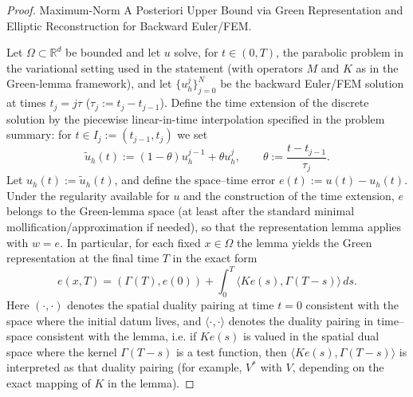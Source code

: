 \documentclass[11pt]{article}
\begin{document}
\begin{proof}
Maximum-Norm A Posteriori Upper Bound via Green Representation and Elliptic Reconstruction for Backward Euler/FEM.

Let $\Omega\subset\mathbb{R}^d$ be bounded and let $u$ solve, for $t\in(0,T)$, the parabolic problem in the variational setting used in the statement (with operators $M$ and $K$ as in the Green-lemma framework), and let $\{u_h^j\}_{j=0}^N$ be the backward Euler/FEM solution at times $t_j=j\tau$ ($\tau_j:=t_j-t_{j-1}$). Define the time extension of the discrete solution by the piecewise linear-in-time interpolation specified in the problem summary: for $t\in I_j:=(t_{j-1},t_j)$ we set
\[
\tilde u_h(t):=(1-\theta)u_h^{j-1}+\theta u_h^j,\qquad \theta:=\frac{t-t_{j-1}}{\tau_j}.
\]
Let $u_h(t):=\tilde u_h(t)$, and define the space--time error $e(t):=u(t)-u_h(t)$. Under the regularity available for $u$ and the construction of the time extension, $e$ belongs to the Green-lemma space (at least after the standard minimal mollification/approximation if needed), so that the representation lemma applies with $w=e$. In particular, for each fixed $x\in\Omega$ the lemma yields the Green representation at the final time $T$ in the exact form
\[
e(x,T)=(\Gamma(T),e(0))+\int_0^T \langle K e(s),\Gamma(T-s)\rangle\,ds.
\]
Here $(\cdot,\cdot)$ denotes the spatial duality pairing at time $t=0$ consistent with the space where the initial datum lives, and $\langle\cdot,\cdot\rangle$ denotes the duality pairing in time--space consistent with the lemma, i.e. if $K e(s)$ is valued in the spatial dual space where the kernel $\Gamma(T-s)$ is a test function, then $\langle K e(s),\Gamma(T-s)\rangle$ is interpreted as that duality pairing (for example, $V^*$ with $V$, depending on the exact mapping of $K$ in the lemma).


\end{proof}
\end{document}
